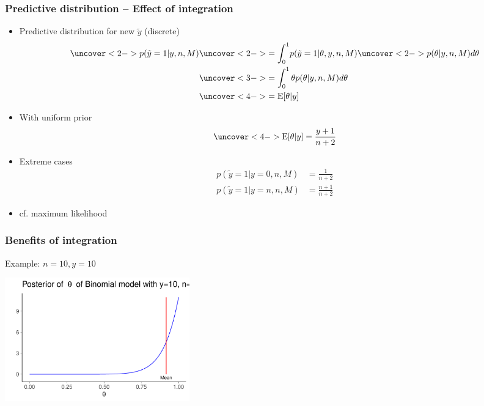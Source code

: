 \documentclass[10pt]{beamer}
\begin{document}
\begin{frame}
  \frametitle{Predictive distribution -- Effect of integration}

  \begin{itemize}
  \item Predictive distribution for new $\tilde{y}$ (discrete)
    \begin{align*}
      \uncover<2->{p(\tilde{y}=1|y,n,M)} & \uncover<2->{= \int_0^1} p(\tilde{y}=1|\theta,y,n,M) \uncover<2->{p(\theta|y,n,M)d\theta}\\
      &\uncover<3->{= \int_0^1 \theta p(\theta|y,n,M)d\theta}\\
      &\uncover<4->{= \E[\theta|y]}
    \end{align*}
    \vskip -4mm
  \item<5-> With uniform prior
    \begin{align*}
      \uncover<4->{\E[\theta|y] = \frac{y+1}{n+2}}
    \end{align*}
  \item<6-> Extreme cases
    \begin{align*}
      p(\tilde{y}=1|y=0,n,M) &= \frac{1}{n+2} \\
      p(\tilde{y}=1|y=n,n,M) &= \frac{n+1}{n+2}
    \end{align*}
    \vskip -2mm

  \item<6-> cf. maximum likelihood

  \end{itemize}
\end{frame}

\begin{frame}
  \frametitle{Benefits of integration}

  Example: $n=10, y=10$
  \begin{center}
  \includegraphics[width=8cm]{figs/dbbeta10.pdf}
  \end{center}

\end{frame}
\end{document}
